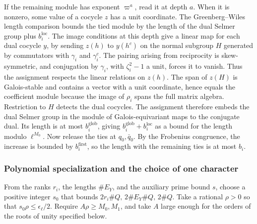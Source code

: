 If the remaining module has exponent \(\varpi^a\), read it at
depth \(a\). When it is nonzero, some value of a cocycle \(z\)
has a unit coordinate. The Greenberg--Wiles length comparison
bounds the tied module by the length of the dual Selmer group
plus \(b_i^{\mathrm{loc}}\). The image conditions at this depth
give a linear map for each dual cocycle \(y\), by sending
\(z(h)\) to \(y(h^c)\) on the normal subgroup \(H\) generated by
commutators with \(\gamma_i\) and \(\gamma_i^c\).
The pairing arising from reciprocity is skew-symmetric, and conjugation
by \(\gamma_i\), with \(\zeta_i^2-1\) a unit, forces it to vanish.
Thus the assignment respects the linear relations on \(z(h)\).
The span of \(z(H)\) is Galois-stable and contains a vector with a
unit coordinate, hence equals the coefficient module because the
image of \(\rho_i\) spans the full matrix algebra. Restriction to
\(H\) detects the dual cocycles. The assignment therefore embeds
the dual Selmer group in the module of Galois-equivariant maps
to the conjugate dual. Its length is at most
\(b_i^{\mathrm{glob}}\), giving \(b_i^{\mathrm{glob}}+b_i^{\mathrm{loc}}\)
as a bound for the length modulo \(\ell^{M_0}\). Now release the ties at
\(q_0,\bar q_0\). By the Frobenius congruence, the increase is bounded
by \(b_i^{\mathrm{first}}\), so the length with the remaining ties
is at most \(b_i\).

\subsubsection{Polynomial specialization and the choice of one character}

From the ranks \(r_i\), the lengths \(\#E_Y\), and the auxiliary
prime bound \(s\), choose a positive integer \(s_0\) that bounds
\(2r_i\#Q,\,2\#E_Y\#Q,\,2\#Q\). Take a rational \(\rho>0\) so
that \(s_0\rho\le\epsilon_\ell/2\). Require \(A\rho\ge M_0,M_1\),
and take \(A\) large enough for the orders of the roots of unity
specified below.

